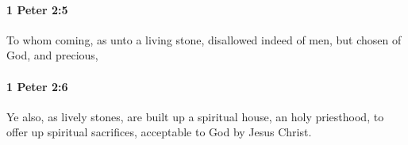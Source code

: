 		\paragraph{1 Peter 2:5} %
			\label{1PETER-2-5}

			To whom coming, as unto a living stone, disallowed indeed of men, but chosen of God, and precious,

			\begin{framed}
			\scriptsize
				\begin{compactdesc}
					\item[SBLG] 
				\end{compactdesc}
			\end{framed}

		\paragraph{1 Peter 2:6} %
			\label{1PETER-2-6}

			Ye also, as lively stones, are built up a spiritual house, an holy priesthood, to offer up spiritual sacrifices, acceptable to God by Jesus Christ.

